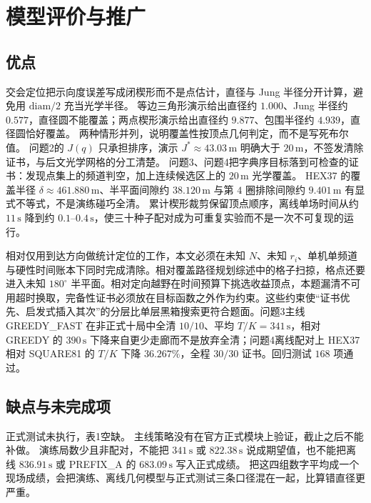 \section{模型评价与推广}

\subsection{优点}

交会定位把示向度误差写成闭楔形而不是点估计，直径与 Jung 半径分开计算，避免用 $\mathrm{diam}/2$ 充当光学半径。
等边三角形演示给出直径约 $1.000$、Jung 半径约 $0.577$，直径圆不能覆盖；两点楔形演示给出直径约 $9.877$、包围半径约 $4.939$，直径圆恰好覆盖。
两种情形并列，说明覆盖性按顶点几何判定，而不是写死布尔值。
问题2的 $J(q)$ 只承担排序，演示 $J^\ast\approx 43.03\,\mathrm{m}$ 明确大于 $20\,\mathrm{m}$，不签发清除证书，与后文光学网格的分工清楚。
问题3、问题4把字典序目标落到可检查的证书：发现点集上的频道判空，加上连续候选区上的 $20\,\mathrm{m}$ 光学覆盖。
HEX37 的覆盖半径 $\delta\approx 461.880\,\mathrm{m}$、半平面间隙约 $38.120\,\mathrm{m}$ 与第 $4$ 圈排除间隙约 $9.401\,\mathrm{m}$ 有显式不等式，不是演练碰巧全清。
累计楔形裁剪保留顶点顺序，离线单场时间从约 $11\,\mathrm{s}$ 降到约 $0.1$--$0.4\,\mathrm{s}$，使三十种子配对成为可重复实验而不是一次不可复现的运行。

相对仅用到达方向做统计定位的工作，本文必须在未知 $N$、未知 $r_i$、单机单频道与硬性时间账本下同时完成清除。相对覆盖路径规划综述中的格子扫掠，格点还要进入未知 $180^\circ$ 半平面。相对定向越野在时间预算下挑选收益顶点，本题漏清不可用超时换取，完备性证书必须放在目标函数之外作为约束。这些约束使“证书优先、启发式插入其次”的分层比单层黑箱搜索更符合题面。问题3主线 GREEDY\_FAST 在非正式十局中全清 $10/10$、平均 $T/K=341\,\mathrm{s}$，相对 GREEDY 的 $390\,\mathrm{s}$ 下降来自更少走廊而不是放弃全清；问题4离线配对上 HEX37 相对 SQUARE81 的 $T/K$ 下降 $36.267\%$，全程 $30/30$ 证书。回归测试 $168$ 项通过。

\subsection{缺点与未完成项}

正式测试未执行，表1空缺。
主线策略没有在官方正式模块上验证，截止之后不能补做。
演练局数少且非配对，不能把 $341\,\mathrm{s}$ 或 $822.38\,\mathrm{s}$ 说成期望值，也不能把离线 $836.91\,\mathrm{s}$ 或 PREFIX\_A 的 $683.09\,\mathrm{s}$ 写入正式成绩。
把这四组数字平均成一个现场成绩，会把演练、离线几何模型与正式测试三条口径混在一起，比算错直径更严重。

